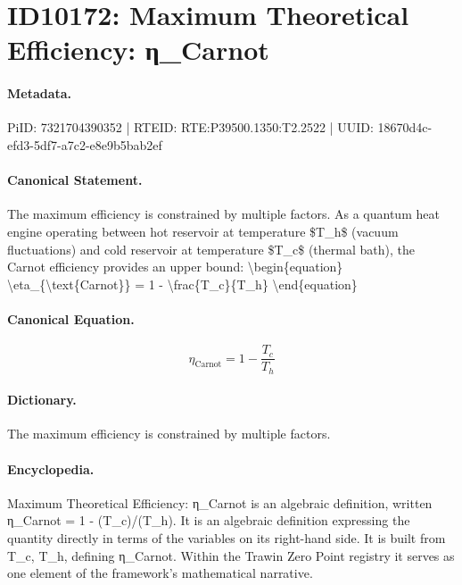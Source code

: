 \section*{ID10172: Maximum Theoretical Efficiency: η\_Carnot}
\paragraph{Metadata.}
PiID: 7321704390352 | RTEID: RTE:P39500.1350:T2.2522 | UUID: 18670d4c-efd3-5df7-a7c2-e8e9b5bab2ef

\paragraph{Canonical Statement.}
The maximum efficiency is constrained by multiple factors. As a quantum heat engine operating between hot reservoir at temperature \$T\_h\$ (vacuum fluctuations) and cold reservoir at temperature \$T\_c\$ (thermal bath), the Carnot efficiency provides an upper bound: \textbackslash{}begin\{equation\} \textbackslash{}eta\_\{\textbackslash{}text\{Carnot\}\} = 1 - \textbackslash{}frac\{T\_c\}\{T\_h\} \textbackslash{}end\{equation\}

\paragraph{Canonical Equation.}
\[
\eta_{\text{Carnot}} = 1 - \frac{T_c}{T_h}
\]

\paragraph{Dictionary.}
The maximum efficiency is constrained by multiple factors.

\paragraph{Encyclopedia.}
Maximum Theoretical Efficiency: η\_Carnot is an algebraic definition, written η\_Carnot = 1 - (T\_c)/(T\_h). It is an algebraic definition expressing the quantity directly in terms of the variables on its right-hand side. It is built from T\_c, T\_h, defining η\_Carnot. Within the Trawin Zero Point registry it serves as one element of the framework's mathematical narrative.
